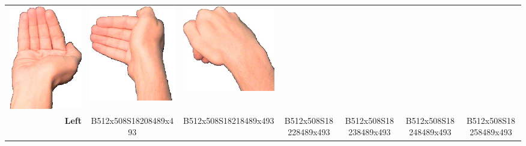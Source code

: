 \documentclass{article}
\begin{document}
\begin{center}
\begin{tabular}{r*{6}{c}}
\includegraphics[scale=0.1]{images/05-20-4.jpg}&
\includegraphics[scale=0.1]{images/05-20-5.jpg}&
\includegraphics[scale=0.1]{images/05-20-6.jpg}\\
\textbf{Left}&
B512x508S18208489x493&
B512x508S18218489x493&
B512x508S18228489x493&
B512x508S18238489x493&
B512x508S18248489x493&
B512x508S18258489x493\\
\end{tabular}
\end{center}
\end{document}
